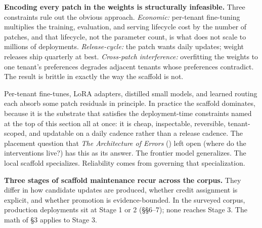 \documentclass[
]{article}
\newcounter{none} %
\begin{document}
\textbf{Encoding every patch in the weights is structurally infeasible.}
Three constraints rule out the obvious approach. \emph{Economic:}
per-tenant fine-tuning multiplies the training, evaluation, and serving
lifecycle cost by the number of patches, and that lifecycle, not the
parameter count, is what does not scale to millions of deployments.
\emph{Release-cycle:} the patch wants daily updates; weight releases
ship quarterly at best. \emph{Cross-patch interference:} overfitting the
weights to one tenant's preferences degrades adjacent tenants whose
preferences contradict. The result is brittle in exactly the way the
scaffold is not.

Per-tenant fine-tunes, LoRA adapters, distilled small models, and
learned routing each absorb some patch residuals in principle. In
practice the scaffold dominates, because it is the substrate that
satisfies the deployment-time constraints named at the top of this
section all at once: it is cheap, inspectable, reversible,
tenant-scoped, and updatable on a daily cadence rather than a release
cadence. The placement question that \emph{The Architecture of Errors}
() left open
(where do the interventions live?) has this as its answer. The frontier
model generalizes. The local scaffold specializes. Reliability comes
from governing that specialization.

\textbf{Three stages of scaffold maintenance recur across the corpus.}
They differ in how candidate updates are produced, whether credit
assignment is explicit, and whether promotion is evidence-bounded. In
the surveyed corpus, production deployments sit at Stage 1 or 2
(§§6--7); none reaches Stage 3. The math of §3 applies to Stage 3.
\end{document}
